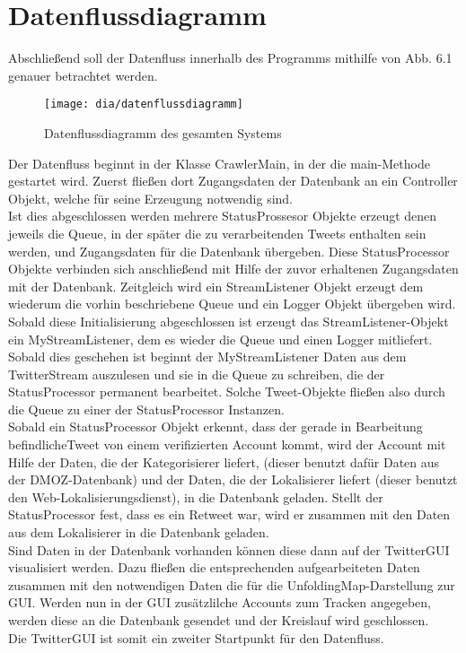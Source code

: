 \section{Datenflussdiagramm}
Abschließend soll der Datenfluss innerhalb des Programms mithilfe von Abb. 6.1 genauer betrachtet werden.

\begin{figure}[h!]
	\centering
	\texttt{[image: dia/datenflussdiagramm]}
	\caption{Datenflussdiagramm des gesamten Systems}
	\label{fig:datenflussdiagramm}
\end{figure}
Der Datenfluss beginnt in der Klasse CrawlerMain, in der die main-Methode gestartet wird. Zuerst fließen dort Zugangsdaten der Datenbank an ein Controller Objekt, welche für seine Erzeugung notwendig sind. \\
Ist dies abgeschlossen werden mehrere StatusProssesor Objekte erzeugt denen jeweils die Queue, in der später die zu verarbeitenden Tweets enthalten sein werden, und Zugangsdaten für die Datenbank übergeben. Diese StatusProcessor Objekte verbinden sich anschließend mit Hilfe der zuvor erhaltenen Zugangsdaten mit der Datenbank. Zeitgleich wird ein StreamListener Objekt erzeugt dem wiederum die vorhin beschriebene Queue und ein Logger Objekt übergeben wird. Sobald diese Initialisierung abgeschlossen ist erzeugt das StreamListener-Objekt ein MyStreamListener, dem es wieder die Queue und einen Logger mitliefert. Sobald dies geschehen ist beginnt der MyStreamListener Daten aus dem TwitterStream auszulesen und sie in die Queue zu schreiben, die der StatusProcessor permanent bearbeitet. Solche Tweet-Objekte fließen also durch die Queue zu einer der StatusProcessor Instanzen. \\
Sobald ein StatusProcessor Objekt erkennt, dass der gerade in Bearbeitung befindlicheTweet von einem verifizierten Account kommt, wird der Account mit Hilfe der Daten, die der Kategorisierer liefert, (dieser benutzt dafür Daten aus der DMOZ-Datenbank) und der Daten, die der Lokalisierer liefert (dieser benutzt den Web-Lokalisierungsdienst), in die Datenbank geladen. Stellt der StatusProcessor fest, dass es ein Retweet war, wird er zusammen mit den Daten aus dem Lokalisierer in die Datenbank geladen.\\
Sind Daten in der Datenbank vorhanden können diese dann auf der TwitterGUI visualisiert werden. Dazu fließen die entsprechenden aufgearbeiteten Daten zusammen mit den notwendigen Daten die für die UnfoldingMap-Darstellung zur GUI. Werden nun in der GUI zusätzlilche Accounts zum Tracken angegeben, werden diese an die Datenbank gesendet und der Kreislauf wird geschlossen.\\
Die TwitterGUI ist somit ein zweiter Startpunkt für den Datenfluss.	
